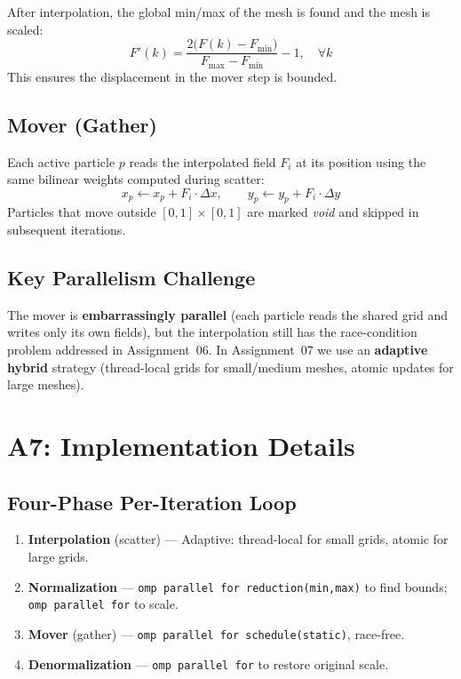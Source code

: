 \documentclass[12pt,a4paper]{article}
\begin{document}
After interpolation, the global min/max of the mesh is found and the mesh is scaled:
\[
F'(k) = \frac{2\bigl(F(k) - F_{\min}\bigr)}{F_{\max} - F_{\min}} - 1, \quad \forall k
\]
This ensures the displacement in the mover step is bounded.

\subsection{Mover (Gather)}

Each active particle $p$ reads the interpolated field $F_i$ at its position using the same
bilinear weights computed during scatter:
\[
x_p \leftarrow x_p + F_i \cdot \Delta x, \qquad y_p \leftarrow y_p + F_i \cdot \Delta y
\]
Particles that move outside $[0,1]\times[0,1]$ are marked \textit{void} and skipped in
subsequent iterations.

\subsection{Key Parallelism Challenge}

The mover is \textbf{embarrassingly parallel} (each particle reads the shared grid and
writes only its own fields), but the interpolation still has the race-condition problem
addressed in Assignment~06. In Assignment~07 we use an \textbf{adaptive hybrid} strategy
(thread-local grids for small/medium meshes, atomic updates for large meshes).

\section{A7: Implementation Details}

\subsection{Four-Phase Per-Iteration Loop}

\begin{enumerate}
    \item \textbf{Interpolation} (scatter) --- Adaptive: thread-local for small grids,
          atomic for large grids.
    \item \textbf{Normalization} --- \texttt{omp parallel for reduction(min,max)} to find
          bounds; \texttt{omp parallel for} to scale.
    \item \textbf{Mover} (gather) --- \texttt{omp parallel for schedule(static)},
          race-free.
    \item \textbf{Denormalization} --- \texttt{omp parallel for} to restore original
          scale.
\end{enumerate}
\end{document}
